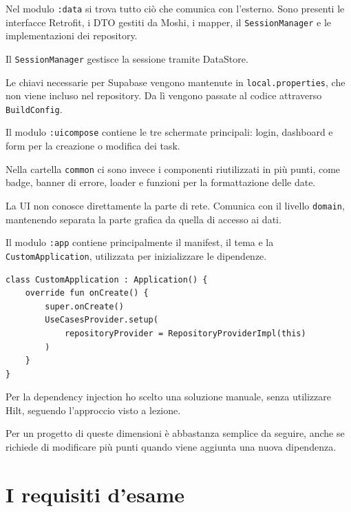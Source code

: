 \documentclass[11pt,a4paper]{article}
\begin{document}
Nel modulo \texttt{:data} si trova tutto ciò che comunica con l'esterno. Sono
presenti le interfacce Retrofit, i DTO gestiti da Moshi, i mapper,
il \texttt{SessionManager} e le implementazioni dei repository.

Il \texttt{SessionManager} gestisce la sessione tramite DataStore.

Le chiavi necessarie per Supabase vengono mantenute in
\texttt{local.properties}, che non viene incluso nel repository. Da lì vengono
passate al codice attraverso \texttt{BuildConfig}.

Il modulo \texttt{:uicompose} contiene le tre schermate principali:
login, dashboard e form per la creazione o modifica dei task.

Nella cartella \texttt{common} ci sono invece i componenti riutilizzati in più
punti, come badge, banner di errore, loader e funzioni per la formattazione
delle date.

La UI non conosce direttamente la parte di rete. Comunica con il livello
\texttt{domain}, mantenendo separata la parte grafica da quella di accesso ai
dati.

Il modulo \texttt{:app} contiene principalmente il manifest, il tema e la
\texttt{CustomApplication}, utilizzata per inizializzare le dipendenze.

\begin{lstlisting}
class CustomApplication : Application() {
    override fun onCreate() {
        super.onCreate()
        UseCasesProvider.setup(
            repositoryProvider = RepositoryProviderImpl(this)
        )
    }
}
\end{lstlisting}

Per la dependency injection ho scelto una soluzione manuale, senza utilizzare
Hilt, seguendo l'approccio visto a lezione.

Per un progetto di queste dimensioni è abbastanza semplice da seguire, anche se
richiede di modificare più punti quando viene aggiunta una nuova dipendenza.


\section{I requisiti d'esame}
\end{document}
